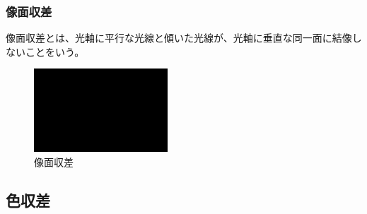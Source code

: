 \subsubsection{像面収差}
像面収差とは、光軸に平行な光線と傾いた光線が、光軸に垂直な同一面に結像しないことをいう。
\begin{figure}[h]
	\centering
	\includegraphics[width=50mm]{image/dummy.png.eps}
	\caption{像面収差}
	\label{caption1}
\end{figure}

\subsection{色収差}